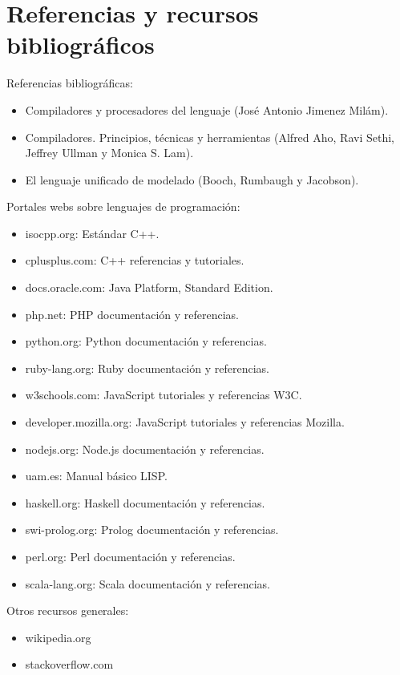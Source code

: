 \section{Referencias y recursos bibliográficos}
Referencias bibliográficas:
\begin{itemize}
\item Compiladores y procesadores del lenguaje (José Antonio Jimenez Milám).
\item Compiladores. Principios, técnicas y herramientas (Alfred Aho, Ravi Sethi, Jeffrey Ullman y Monica S. Lam).
\item El lenguaje unificado de modelado (Booch, Rumbaugh y Jacobson).
\end{itemize}

Portales webs sobre lenguajes de programación:
\begin{itemize}
\item isocpp.org: Estándar C++.
\item cplusplus.com: C++ referencias y tutoriales.
\item docs.oracle.com: Java Platform, Standard Edition.
\item php.net: PHP documentación y referencias.
\item python.org: Python documentación y referencias.
\item ruby-lang.org: Ruby documentación y referencias.
\item w3schools.com: JavaScript tutoriales y referencias W3C.
\item developer.mozilla.org: JavaScript tutoriales y referencias Mozilla.
\item nodejs.org: Node.js documentación y referencias.
\item uam.es: Manual básico LISP.
\item haskell.org: Haskell documentación y referencias.
\item swi-prolog.org: Prolog documentación y referencias.
\item perl.org: Perl documentación y referencias.
\item scala-lang.org: Scala documentación y referencias.
\end{itemize}

Otros recursos generales:
\begin{itemize}
\item wikipedia.org
\item stackoverflow.com
\end{itemize}
